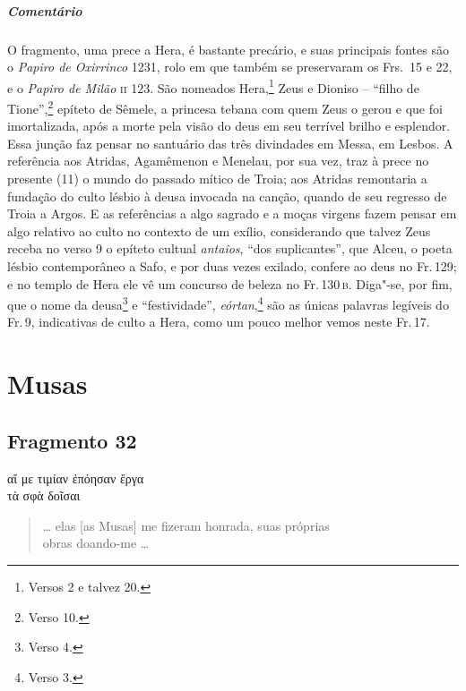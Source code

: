\pagebreak
{\paragraph{Comentário} O fragmento, uma prece a Hera, é bastante precário, e suas principais fontes são o \textit{Papiro de Oxirrinco} 1231, rolo em que também se preservaram os Frs.~15 e 22, e o \textit{Papiro de Milão} \textsc{ii} 123. São nomeados Hera,\footnote{Versos 2 e talvez 20.} Zeus e Dioniso -- ``filho de Tione'',\footnote{Verso 10.} epíteto de Sêmele, a princesa tebana com quem Zeus o gerou e que foi imortalizada, após a morte pela visão do deus em seu terrível brilho e esplendor. Essa junção faz pensar no santuário das três divindades em Messa, em Lesbos. A referência aos Atridas, Agamêmenon e Menelau, por sua vez, traz à prece no presente (11) o mundo do passado mítico de Troia; aos Atridas remontaria a fundação do culto lésbio à deusa invocada na canção, quando de seu regresso de Troia a Argos. E as referências a algo sagrado e a moças virgens
fazem pensar em algo relativo ao culto no contexto de um exílio, considerando que talvez Zeus receba no verso 9 o epíteto cultual \textit{antaîos}, ``dos suplicantes'', que Alceu, o poeta lésbio contemporâneo a Safo, e por duas vezes exilado, confere ao deus no Fr.\,129; e no templo de Hera ele vê um concurso de beleza no Fr.\,130\,\textsc{b}. Diga"-se, por fim, que o nome da deusa\footnote{Verso 4.} e ``festividade'', \textit{eórtan},\footnote{Verso 3.} são as únicas palavras legíveis do Fr.\,9, indicativas de culto a Hera, como um pouco melhor vemos neste Fr.\,17.}



\chapter{Musas}

\section{Fragmento 32}

\begin{gkverse}
αἴ με τιμίαν ἐπόησαν ἔργα\\
τὰ σφὰ δοῖσαι
\end{gkverse}

\begin{verse}
\ldots{} elas [as Musas] me fizeram honrada, suas próprias\\
obras doando-me \ldots{}
\end{verse}

